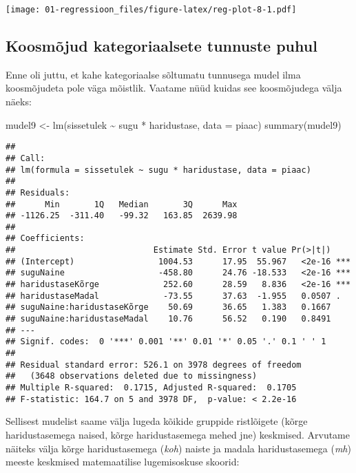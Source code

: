 \documentclass[
]{book}
\newenvironment{Shaded}{\begin{snugshade}}{\end{snugshade}}
\newcommand{\AttributeTok}[1]{\textcolor[rgb]{0.77,0.63,0.00}{#1}}
\newcommand{\FunctionTok}[1]{\textcolor[rgb]{0.00,0.00,0.00}{#1}}
\newcommand{\NormalTok}[1]{#1}
\newcommand{\OtherTok}[1]{\textcolor[rgb]{0.56,0.35,0.01}{#1}}
\newcommand{\SpecialCharTok}[1]{\textcolor[rgb]{0.00,0.00,0.00}{#1}}
\begin{document}
\texttt{[image: 01-regressioon\_files/figure-latex/reg-plot-8-1.pdf]}

\hypertarget{koosmuxf5jud-kategoriaalsete-tunnuste-puhul}{%
\subsection{Koosmõjud kategoriaalsete tunnuste puhul}\label{koosmuxf5jud-kategoriaalsete-tunnuste-puhul}}

Enne oli juttu, et kahe kategoriaalse sõltumatu tunnusega mudel ilma koosmõjudeta pole väga mõistlik. Vaatame nüüd kuidas see koosmõjudega välja näeks:

\begin{Shaded}
\begin{Highlighting}[]
\NormalTok{mudel9 }\OtherTok{\textless{}{-}} \FunctionTok{lm}\NormalTok{(sissetulek }\SpecialCharTok{\textasciitilde{}}\NormalTok{ sugu }\SpecialCharTok{*}\NormalTok{ haridustase, }\AttributeTok{data =}\NormalTok{ piaac)}
\FunctionTok{summary}\NormalTok{(mudel9)}
\end{Highlighting}
\end{Shaded}

\begin{verbatim}
## 
## Call:
## lm(formula = sissetulek ~ sugu * haridustase, data = piaac)
## 
## Residuals:
##      Min       1Q   Median       3Q      Max 
## -1126.25  -311.40   -99.32   163.85  2639.98 
## 
## Coefficients:
##                            Estimate Std. Error t value Pr(>|t|)    
## (Intercept)                 1004.53      17.95  55.967   <2e-16 ***
## suguNaine                   -458.80      24.76 -18.533   <2e-16 ***
## haridustaseKõrge             252.60      28.59   8.836   <2e-16 ***
## haridustaseMadal             -73.55      37.63  -1.955   0.0507 .  
## suguNaine:haridustaseKõrge    50.69      36.65   1.383   0.1667    
## suguNaine:haridustaseMadal    10.76      56.52   0.190   0.8491    
## ---
## Signif. codes:  0 '***' 0.001 '**' 0.01 '*' 0.05 '.' 0.1 ' ' 1
## 
## Residual standard error: 526.1 on 3978 degrees of freedom
##   (3648 observations deleted due to missingness)
## Multiple R-squared:  0.1715, Adjusted R-squared:  0.1705 
## F-statistic: 164.7 on 5 and 3978 DF,  p-value: < 2.2e-16
\end{verbatim}

Sellisest mudelist saame välja lugeda kõikide gruppide ristlõigete (kõrge haridustasemega naised, kõrge haridustasemega mehed jne) keskmised. Arvutame näiteks välja kõrge haridustasemega (\emph{koh}) naiste ja madala haridustasemega (\emph{mh}) meeste keskmised matemaatilise lugemisoskuse skoorid:
\end{document}
